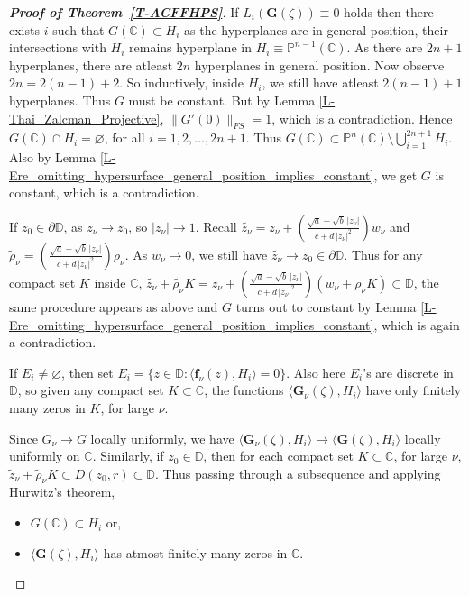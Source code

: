 \documentclass[11pt, reqno]{amsart}
\theoremstyle{definition}
\theoremstyle{remark}
\numberwithin{equation}{section}
\begin{document}
\begin{proof}[{\bf Proof of Theorem~\ref{T-ACFFHPS}}]
If $L_i(\mathbf{G}(\zeta))\equiv 0$ holds then there exists $i$ such that $G(\mathbb C)\subset H_i$ as 
the hyperplanes are in general position, their intersections with $H_i$ 
remains hyperplane in $H_i\equiv\mathbb P^{n-1}(\mathbb C)$. As there are $2n+1$ hyperplanes, there are atleast $2n$ hyperplanes in general position. Now observe 
$2n=2(n-1)+2$. So inductively, inside $H_i$, we still have atleast $2(n-1)+1$ hyperplanes. Thus $G$ must be constant. But by Lemma \ref{L-Thai_Zalcman_Projective}, 
$\|G'(0)\|_{FS}=1$, which is a contradiction. Hence $G(\mathbb C)\cap H_i=\varnothing$, for all $i=1,2,\dots,2n+1$.
Thus $G(\mathbb C)\subset \mathbb P^n(\mathbb C)\setminus \bigcup_{i=1}^{2n+1}H_i$. Also by Lemma \ref{L-Ere_omitting_hypersurface_general_position_implies_constant}, we get $G$ is constant, which is a contradiction. \smallskip

If $z_0\in\partial\mathbb D$, as $z_{\nu}\to z_0$, so $|z_{\nu}|\to 1$. Recall 
$\widetilde{z_{\nu}}=z_{\nu}+\left(\frac{\sqrt{a}-\sqrt{b}\,|z_{\nu}|}{c+d\,|z_{\nu}|^2}\right)w_{\nu}$ and 
$\widetilde \rho_{\nu}=\left(\frac{\sqrt{a}-\sqrt{b}\,|z_{\nu}|}{c+d\,|z_{\nu}|^2}\right)\rho_{\nu}$. As $w_{\nu}\to 0$, we 
still have $\widetilde{z_{\nu}}\to z_0\in\partial\mathbb D$. Thus for any compact set $K$ inside $\mathbb C$, 
$\widetilde{z_{\nu}}+\widetilde{\rho_{\nu}}K=z_{\nu}+\left(\frac{\sqrt{a}-\sqrt{b}\,|z_{\nu}|}{c+d\,|z_{\nu}|^2}\right)(w_{\nu}+\rho_{\nu} K)\subset\mathbb D$, 
the same procedure appears as above and $G$ turns out to 
constant by Lemma \ref{L-Ere_omitting_hypersurface_general_position_implies_constant}, which is again a contradiction. \smallskip

If $E_i\neq\varnothing$, then set $E_i=\{z\in\mathbb D:\langle\mathbf{f}_{\nu}(z),H_i\rangle=0\}$. Also here $E_i$'s
are discrete in $\mathbb D$, 
so given any compact set $K\subset \mathbb C$, the functions 
$\langle\mathbf{G}_{\nu}(\zeta),H_i\rangle$ have only finitely many zeros in $K$, for large $\nu$. \smallskip

Since $G_{\nu}\to G$ locally uniformly, we have $\langle\mathbf{G}_{\nu}(\zeta),H_i\rangle\to \langle\mathbf{G}(\zeta),H_i\rangle$ locally uniformly
on $\mathbb C$. Similarly, if $z_0\in\mathbb D$, then for each compact set $K\subset\mathbb C$, for large $\nu$,
$\widetilde z_{\nu} +\widetilde \rho_{\nu} K\subset D(z_0,r)\subset \mathbb D$.
Thus passing through a subsequence and applying Hurwitz's theorem, 
\begin{itemize}
    \item $G(\mathbb C)\subset H_i$ or,
    \item $\langle\mathbf{G}(\zeta),H_i\rangle$ has atmost finitely many zeros in $\mathbb C$.
\end{itemize}


\end{proof}
\end{document}
